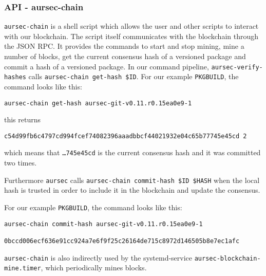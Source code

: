 \subsubsection{API - aursec-chain}\label{sec:aursec-chain}
\texttt{aursec-chain} is a shell script which allows the user and other scripts to interact with our blockchain.
The script itself communicates with the blockchain through the JSON RPC.
It provides the commands to start and stop mining, mine a number of blocks, get the current consensus hash of a versioned package and commit a hash of a versioned package.
In our command pipeline, \texttt{aursec-verify-hashes} calls \texttt{aursec-chain get-hash \$ID}.
For our example \texttt{PKGBUILD}, the command looks like this:

\begin{verbatim}
aursec-chain get-hash aursec-git-v0.11.r0.15ea0e9-1
\end{verbatim}

this returns

\begin{verbatim}
c54d99fb6c4797cd994fcef74082396aaadbbcf44021932e04c65b77745e45cd 2
\end{verbatim}

which means that \texttt{\ldots745e45cd} is the current consensus hash and it was committed two times.

Furthermore \texttt{aursec} calls \texttt{aursec-chain commit-hash \$ID \$HASH} when the local hash is trusted in order to include it in the blockchain and update the consensus.

For our example \texttt{PKGBUILD}, the command looks like this:

\begin{verbatim}
aursec-chain commit-hash aursec-git-v0.11.r0.15ea0e9-1
		0bccd006ecf636e91cc924a7e6f9f25c26164de715c8972d146505b8e7ec1afc
\end{verbatim}

\texttt{aursec-chain} is also indirectly used by the systemd-service \texttt{aursec-blockchain-mine.timer}, which periodically mines blocks.
